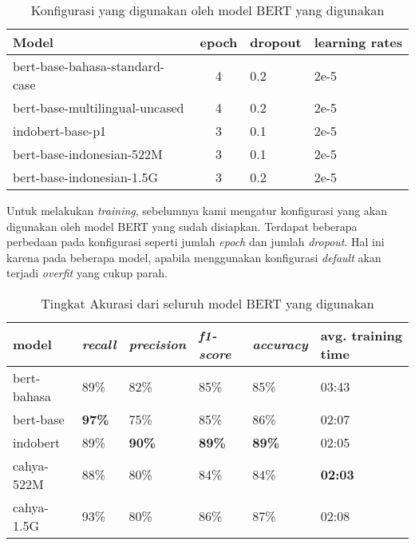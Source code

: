\begin{table}
    \centering
    \caption{Konfigurasi yang digunakan oleh model BERT yang digunakan}
    \label{tab:multi_bert_config}
    \begin{tabular}{|p{.5\linewidth}|c|l|p{.12\linewidth} |}
        \hline
        Model                          & epoch & dropout & learning rates \\ \hline
        bert-base-bahasa-standard-case & 4     & 0.2     & 2e-5           \\ \hline
        bert-base-multilingual-uncased & 4     & 0.2     & 2e-5           \\ \hline
        indobert-base-p1               & 3     & 0.1     & 2e-5           \\ \hline
        bert-base-indonesian-522M      & 3     & 0.1     & 2e-5           \\ \hline
        bert-base-indonesian-1.5G      & 3     & 0.2     & 2e-5           \\ \hline
    \end{tabular}
\end{table}

Untuk melakukan \textit{training}, sebelumnya kami mengatur konfigurasi yang akan digunakan oleh model BERT yang sudah disiapkan. Terdapat beberapa perbedaan pada konfigurasi seperti jumlah \textit{epoch} dan jumlah \textit{dropout}. Hal ini karena pada beberapa model, apabila menggunakan konfigurasi \textit{default} akan terjadi \textit{overfit} yang cukup parah.

\begin{table}
    \centering
    \caption{Tingkat Akurasi dari seluruh model BERT yang digunakan}
    \label{tab:model_bert_result}
    \begin{tabular}{|l|l|l|l|l|p{.12\linewidth}|}
        \hline
        \textbf{model} & \textit{\textbf{recall}} & \textit{\textbf{precision}} & \textit{\textbf{f1-score}} & \textit{\textbf{accuracy}} & \textbf{avg. training time} \\ \hline
        bert-bahasa    & 89\%                     & 82\%                        & 85\%                       & 85\%                       & 03:43                       \\ \hline
        bert-base      & \textbf{97\%}            & 75\%                        & 85\%                       & 86\%                       & 02:07                       \\ \hline
        indobert       & 89\%                     & \textbf{90\%}               & \textbf{89\%}              & \textbf{89\%}              & 02:05                       \\ \hline
        cahya-522M     & 88\%                     & 80\%                        & 84\%                       & 84\%                       & \textbf{02:03}              \\ \hline
        cahya-1.5G     & 93\%                     & 80\%                        & 86\%                       & 87\%                       & 02:08                       \\ \hline
    \end{tabular}
\end{table}